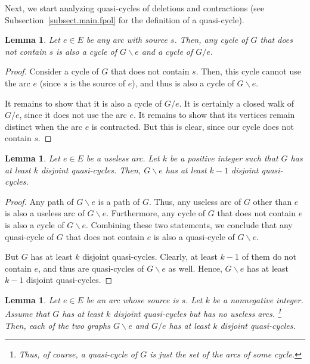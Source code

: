 \documentclass[12pt]{amsart}
\newtheorem{lemma}[theorem]{Lemma}
\theoremstyle{definition}
\begin{document}
Next, we start analyzing quasi-cycles of deletions and contractions
(see Subsection~\ref{subsect.main.fpol} for the definition of a quasi-cycle).

\begin{lemma} \label{lem.G/e-cyc}
	Let $e \in E$ be any arc with source $s$.
	Then, any cycle of $G$ that does not contain $s$
	is also a cycle of $G \backslash e$ and a cycle of $G / e$.
\end{lemma}

\begin{proof}
Consider a cycle of $G$ that does not contain $s$.
Then, this cycle cannot use the arc $e$ (since $s$ is
the source of $e$), and thus is also a cycle of
$G \backslash e$.

It remains to show that it is also a cycle of $G / e$.
It is certainly a closed walk of $G / e$, since it does
not use the arc $e$.
It remains to show that its vertices remain distinct
when the arc $e$ is contracted.
But this is clear, since our cycle does not contain $s$.
\end{proof}

\begin{lemma} \label{lem.G/e.quasi1}
    Let $e \in E$ be a useless arc.
    Let $k$ be a positive integer such that $G$ has
    at least $k$ disjoint quasi-cycles.
    Then, $G \backslash e$ has at least $k-1$ disjoint quasi-cycles.
\end{lemma}

\begin{proof}
Any path of $G \backslash e$ is a path of $G$.
Thus, any useless arc of $G$ other than $e$ is also a useless arc of $G \backslash e$.
Furthermore, any cycle of $G$ that does not contain $e$ is also
a cycle of $G \backslash e$.
Combining these two statements, we conclude that any quasi-cycle
of $G$ that does not contain $e$ is also a quasi-cycle of $G \backslash e$.

But $G$ has at least $k$ disjoint quasi-cycles.
Clearly, at least $k-1$ of them do not contain $e$,
and thus are quasi-cycles of $G \backslash e$ as well.
Hence, $G \backslash e$ has at least $k-1$ disjoint quasi-cycles.
\end{proof}

\begin{lemma} \label{lem.G/e.quasiB}
    Let $e \in E$ be an arc whose source is $s$.
    Let $k$ be a nonnegative integer.
    Assume that $G$ has at least $k$ disjoint quasi-cycles but has no useless arcs.%
	\footnote{Thus, of course, a quasi-cycle of $G$ is just the set of the arcs of some cycle.}
    Then, each of the two graphs $G \backslash e$ and $G / e$
    has at least $k$ disjoint quasi-cycles.
\end{lemma}
\end{document}
